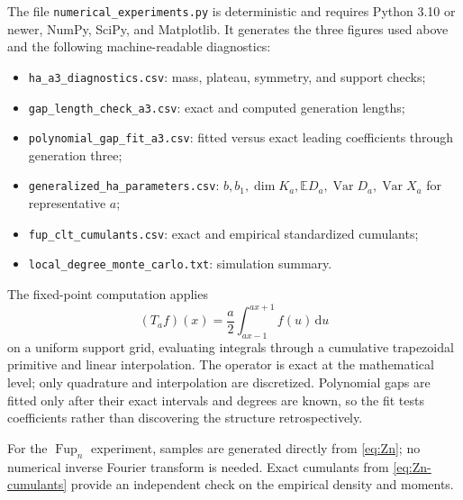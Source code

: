 \documentclass[11pt]{article}
\theoremstyle{definition}
\theoremstyle{remark}
\newcommand{\Fup}{\operatorname{Fup}}
\newcommand{\E}{\mathbb{E}}
\newcommand{\dd}{\,\mathrm{d}}
\begin{document}
The file \texttt{numerical\_experiments.py} is deterministic and requires Python 3.10 or newer, NumPy, SciPy, and Matplotlib.  It generates the three figures used above and the following machine-readable diagnostics:
\begin{itemize}
  \item \texttt{ha\_a3\_diagnostics.csv}: mass, plateau, symmetry, and support checks;
  \item \texttt{gap\_length\_check\_a3.csv}: exact and computed generation lengths;
  \item \texttt{polynomial\_gap\_fit\_a3.csv}: fitted versus exact leading coefficients through generation three;
  \item \texttt{generalized\_ha\_parameters.csv}: \(b,b_1,\dim K_a,\E D_a,\operatorname{Var}D_a,\operatorname{Var}X_a\) for representative \(a\);
  \item \texttt{fup\_clt\_cumulants.csv}: exact and empirical standardized cumulants;
  \item \texttt{local\_degree\_monte\_carlo.txt}: simulation summary.
\end{itemize}

The fixed-point computation applies
\begin{equation}
  (T_af)(x)=\frac a2\int_{ax-1}^{ax+1}f(u)\dd u
  \label{eq:numerical-Ta}
\end{equation}
on a uniform support grid, evaluating integrals through a cumulative trapezoidal primitive and linear interpolation.  The operator is exact at the mathematical level; only quadrature and interpolation are discretized.  Polynomial gaps are fitted only after their exact intervals and degrees are known, so the fit tests coefficients rather than discovering the structure retrospectively.

For the \(\Fup_n\) experiment, samples are generated directly from \eqref{eq:Zn}; no numerical inverse Fourier transform is needed.  Exact cumulants from \eqref{eq:Zn-cumulants} provide an independent check on the empirical density and moments.
\end{document}

